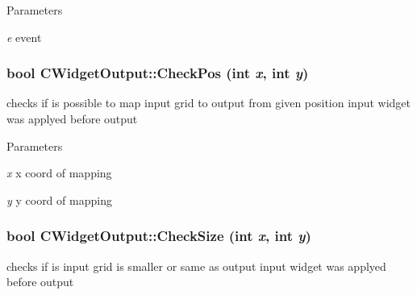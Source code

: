 \begin{DoxyParams}{Parameters}
\item[{\em e}]event \end{DoxyParams}
\hypertarget{classCWidgetOutput_aee8224c38a13ee5bc2badcbfae43a4b0}{
\subsubsection[{CheckPos}]{\setlength{\rightskip}{0pt plus 5cm}bool CWidgetOutput::CheckPos (int {\em x}, \/  int {\em y})}}
\label{classCWidgetOutput_aee8224c38a13ee5bc2badcbfae43a4b0}
checks if is possible to map input grid to output from given position input widget was applyed before output


\begin{DoxyParams}{Parameters}
\item[{\em x}]x coord of mapping \item[{\em y}]y coord of mapping \end{DoxyParams}
\hypertarget{classCWidgetOutput_a118825abe1b61b854786bf899df97903}{
\subsubsection[{CheckSize}]{\setlength{\rightskip}{0pt plus 5cm}bool CWidgetOutput::CheckSize (int {\em x}, \/  int {\em y})}}
\label{classCWidgetOutput_a118825abe1b61b854786bf899df97903}
checks if is input grid is smaller or same as output input widget was applyed before output


